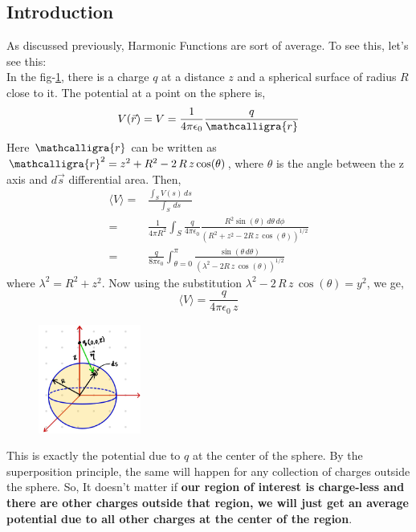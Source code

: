 \documentclass{article}
\newcommand{\scriptr}{\mathord{\mathcalligra{r}}}
\begin{document}
\subsection{Introduction}
As discussed previously, Harmonic Functions are sort of average. To see this, let's see this:\\
In the fig-\ref{sp_av_cen}, there is a charge $q$ at a distance $z$ and a spherical surface of radius $R$ close to it. The potential at a point on the sphere is,
\begin{equation*}
    V(\vec{r})=V = \frac{1}{4\pi \epsilon_0}\frac{q}{\scriptr}
\end{equation*}
Here $\scriptr$ can be written as $\scriptr^2=z^2 + R^2 -2\, R\, z \cos(\theta)$, where $\theta$ is the angle between the z axis and $d\vec{s}$ differential area. Then,
\begin{equation}
    \begin{split}
        \langle V\rangle = & \frac{\int_S V(s)\, ds}{\int_S \,ds}\\
                        = & \frac{1}{4\pi R^2}\int_S \frac{q}{4\pi \epsilon_0} \frac{R^2 \sin(\theta)\, d\theta \, d\phi}{(R^2 + z^2 -2R\, z \, \cos(\theta))^{1/2}}\\
                        = & \frac{q}{8\pi \epsilon_0}\int_{\theta = 0}^{\pi} \frac{\sin(\theta\, d\theta)}{(\lambda^2 - 2R\, z\, \cos(\theta))^{1/2}}
    \end{split}
\end{equation}
where $\lambda^2=R^2+z^2$. Now using the substitution $\lambda^2-2\, R\, z\, \cos(\theta)=y^2$, we ge,
\begin{equation}
    \langle V\rangle = \frac{q}{4\pi \epsilon_0 \, z}
\end{equation} 
\begin{figure}[H]
\centering
\includegraphics[width=0.3\textwidth]{Images/sp_av_cen.jpeg}
\caption{}
\label{sp_av_cen}
\end{figure}
This is exactly the potential due to $q$ at the center of the sphere. By the superposition principle, the same will happen for any collection of charges outside the sphere. So, It doesn't matter if \textbf{our region of interest is charge-less and there are other charges outside that region, we will just get an average potential due to all other charges at the center of the region}.
\end{document}
